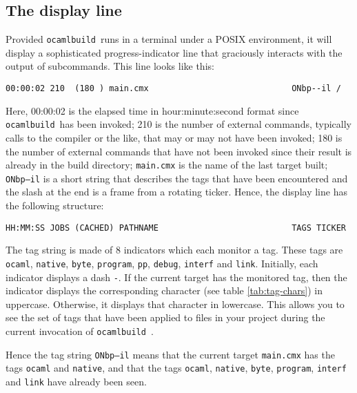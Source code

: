 \documentclass[12pt]{article}
\newcommand{\ocb}{\texttt{ocamlbuild}~}
\begin{document}
\subsection{The display line}
Provided \ocb runs in a terminal under a POSIX environment, it will
display a sophisticated progress-indicator line that graciously interacts
with the output of subcommands.  This line looks like this:
\begin{verbatim}
00:00:02 210  (180 ) main.cmx                             ONbp--il /
\end{verbatim}
Here, 00:00:02 is the elapsed time in hour:minute:second format since \ocb has
been invoked; 210 is the number of external commands, typically calls to the
compiler or the like, that may or may not have been invoked; 180 is the number
of external commands that have not been invoked since their result is already
in the build directory; \texttt{main.cmx} is the name of the last target built;
\texttt{ONbp--il} is a short string that describes the tags that have been
encountered and the slash at the end is a frame from a rotating ticker.  Hence,
the display line has the following structure:
\begin{verbatim}
HH:MM:SS JOBS (CACHED) PATHNAME                           TAGS TICKER
\end{verbatim}

The tag string is made of 8 indicators which each monitor a tag. These tags
are \texttt{ocaml}, \texttt{native}, \texttt{byte}, \texttt{program},
\texttt{pp}, \texttt{debug}, \texttt{interf} and \texttt{link}.  Initially,
each indicator displays a dash \texttt{-}.  If the current target has the
monitored tag, then the indicator displays the corresponding character
(see table \ref{tab:tag-chars}) in uppercase.  Otherwise, it displays that
character in lowercase.  This allows you to see the set of tags that have
been applied to files in your project during the current invocation of \ocb.

Hence the tag string \texttt{ONbp--il} means that the current target
\texttt{main.cmx} has the tags \texttt{ocaml} and \texttt{native}, and that
the tags \texttt{ocaml}, \texttt{native}, \texttt{byte}, \texttt{program},
\texttt{interf} and \texttt{link} have already been seen.
\end{document}
